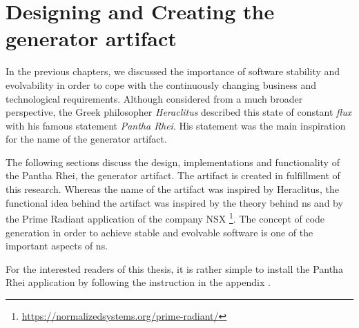 \section{Designing and Creating the generator artifact} \label{sec_generator_artifact}

In the previous chapters, we discussed the importance of software stability and
evolvability in order to cope with the continuously changing business and technological
requirements. Although considered from a much broader perspective, the Greek philosopher
\emph{Heraclitus} described this state of constant \emph{flux} with his famous statement
\emph{Pantha Rhei}. His statement was the main inspiration for the name of the generator
artifact.

The following sections discuss the design, implementations and functionality of the Pantha
Rhei, the generator artifact. The artifact is created in fulfillment of this research.
Whereas the name of the artifact was inspired by Heraclitus, the functional idea behind
the artifact was inspired by the theory behind \gls{ns} and by the Prime Radiant
application of the company NSX
\footnote{\url{https://normalizedsystems.org/prime-radiant/}}. The concept of code
generation in order to achieve stable and evolvable software is one of the important aspects
of \gls{ns}.

For the interested readers of this thesis, it is rather simple to install the Pantha Rhei
application by following the instruction in the appendix
.







